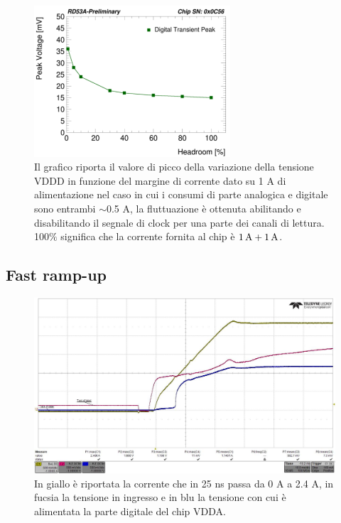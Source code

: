 \begin{figure}
\centering
\includegraphics[width=0.65\textwidth]{Immagini/LoadTransientDominik}
\caption{Il grafico riporta il valore di picco della variazione della tensione VDDD  in funzione del margine di corrente dato su 1 A di alimentazione nel caso in cui  i consumi di parte analogica e digitale sono entrambi $\sim$0.5 A, la fluttuazione è ottenuta abilitando e disabilitando il segnale di clock per una parte dei canali di lettura. 100$\%$ significa che la corrente fornita al chip è $1 \rm \, A+1 \rm \, A$.}
\label{LoadTransient}
\end{figure}

\subsection{Fast ramp-up}

\begin{figure}
\centering
\includegraphics[scale=.3]{Immagini/rd-powup-dir6}
\caption{In giallo è riportata la corrente che in 25 ns passa da 0 A a 2.4 A, in fucsia la tensione in ingresso e in blu la tensione con cui è alimentata la parte digitale del chip VDDA.}
\label{rd-powup-dir6}
\end{figure}

